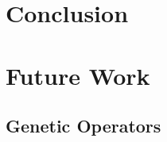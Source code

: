 \documentclass{acm_proc_article-sp}
\begin{document}
    \section{Conclusion}
    
    
    \section{Future Work}
    
    \subsection{Genetic Operators}
    
    


%


\begin{thebibliography}{1}


\end{thebibliography}


\balancecolumns
\end{document}
